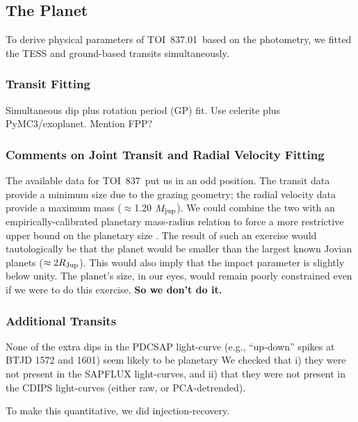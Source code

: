 \documentclass[12pt,twocolumn,tighten]{aastex63}
\newcommand{\tn}{TOI~837} %
\newcommand{\pn}{TOI~837.01} %
\begin{document}
\subsection{The Planet}
\label{subsec:planet}

To derive physical parameters of \pn\ based on the photometry, we
fitted the TESS and ground-based transits simultaneously.

\subsubsection{Transit Fitting}
Simultaneous dip plus rotation period (GP) fit. Use celerite plus PyMC3/exoplanet.
Mention FPP?


\subsubsection{Comments on Joint Transit and Radial Velocity Fitting}

The available data for \tn\ put us in an odd position. The transit
data provide a minimum size due to the grazing geometry; the radial
velocity data provide a maximum mass ($\approx$1.20 $M_{\rm jup}$).
We could combine the two with an empirically-calibrated planetary
mass-radius relation to force a more restrictive upper bound on the
planetary size \citep[{\it e.g.},][]{chen_probabilistic_2016}.  The
result of such an exercise would tautologically be that the planet
would be smaller than the largest known Jovian planets ($\approx
2R_{\rm Jup}$).  This would also imply that the impact parameter is
slightly below unity.  The planet's size, in our eyes, would remain
poorly constrained even if we were to do this exercise. {\bf So we
don't do it.}


\subsubsection{Additional Transits}
None of the extra dips in the PDCSAP light-curve (e.g., ``up-down''
spikes at BTJD 1572 and 1601) seem likely to be planetary
We checked that i) they were not present in the SAPFLUX light-curves,
and ii) that they were not present in the CDIPS light-curves (either
raw, or PCA-detrended).

To make this quantitative, we did injection-recovery.
\end{document}
